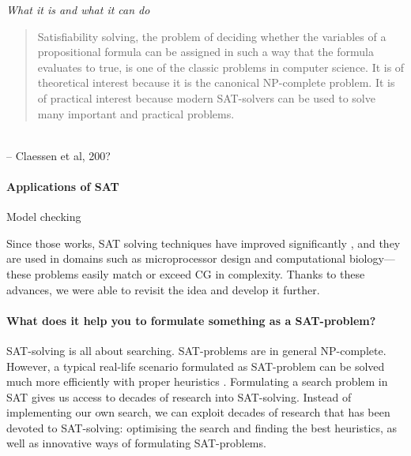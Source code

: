 \emph{What it is and what it can do}


\begin{quote}
Satisfiability solving, the problem of deciding whether the variables of a propositional formula can be assigned in such a way that the formula evaluates to true, is one of the classic problems in computer science. It is of theoretical interest because it is the canonical NP-complete problem. It is of practical interest because modern SAT-solvers can be used to solve many important and practical problems.\end{quote} \\
-- Claessen et al, 200?



\paragraph{Applications of SAT}

Model checking

Since those works, SAT solving techniques have improved significantly \cite{marques_silva2010}, and they are used in domains such as microprocessor design and computational 
biology---these problems easily match or exceed CG in complexity. 
Thanks to these advances, we were able to revisit the idea and develop it
further. 


\paragraph{What does it help you to formulate something as a SAT-problem?}

SAT-solving is all about searching.
SAT-problems are in general NP-complete. However, a typical real-life scenario formulated as SAT-problem can be solved much more efficiently with proper heuristics \cite{claessen_al}.
Formulating a search problem in SAT gives us access to decades of research into SAT-solving. 
Instead of implementing our own search, we can exploit decades of research that has been devoted to SAT-solving: optimising the search and finding the best heuristics, as well as innovative ways of formulating SAT-problems.